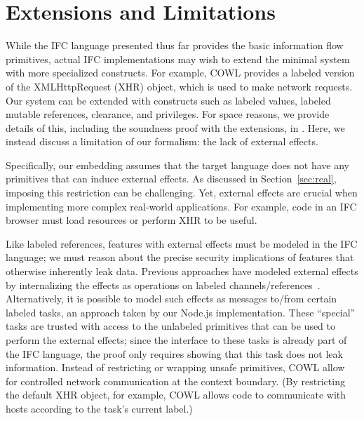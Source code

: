 
\section{Extensions and Limitations}
\label{sec:extensions}
\label{sec:extensions:labeled}

While the IFC language presented thus far provides the basic
information flow primitives, actual IFC implementations
may wish to extend the minimal system with more specialized
constructs.
For example, COWL provides a labeled version of the XMLHttpRequest (XHR) object,
which is used to make network requests.
%
Our system can be extended with constructs such as labeled values,
labeled mutable references, clearance, and privileges.
For space reasons, we provide
details of this, including the soundness
proof with the extensions, in \appendixextfirst{}.
%
Here, we instead discuss a limitation of our formalism: the lack of
external effects.


Specifically, our embedding assumes that the target language does not
have any primitives that can induce external effects.
%
As discussed in Section~\ref{sec:real}, imposing this restriction
can be challenging.
%
Yet, external effects are crucial when implementing more complex
real-world applications.
%
For example, code in an IFC browser must load resources or
perform XHR to be useful.

Like labeled references, features with external effects must be
modeled in the IFC language; we must reason about the precise security
implications of features that otherwise inherently leak data.
%
Previous approaches have modeled external effects by internalizing the
effects as operations on labeled channels/references~\cite{stefan:addressing-covert}.
%
Alternatively, it is possible to model such effects as messages to/from
certain labeled tasks, an approach taken by our Node.js
implementation.
%
These ``special'' tasks are trusted with access to the unlabeled
primitives that can be used to perform the external effects; since the
interface to these tasks is already part of the IFC language, the
proof only requires showing that this task does not leak information.
%
Instead of restricting or wrapping unsafe primitives,
COWL allow for
controlled network communication at the context boundary.
%
(By restricting the default XHR object, for example, COWL allows code
to communicate with hosts according to the task's current label.)
